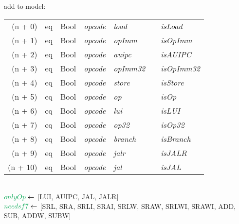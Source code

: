 \begin{algorithm}
    add to model:\\
    \begin{tabular}[h]{>{\ttfamily\color{UniRed}}r >{\ttfamily}l >{\ttfamily\color{UniGrey}}l >{\slshape\color{UniRed}}l >{\slshape\color{UniRed}}l >{\slshape\color{UniRed}}l >{\slshape} l}
        \hline
        \hline
        (n + 0)  & eq & Bool & opcode & load    &  & isLoad    \\
        (n + 1)  & eq & Bool & opcode & opImm   &  & isOpImm   \\
        (n + 2)  & eq & Bool & opcode & auipc   &  & isAUIPC   \\
        (n + 3)  & eq & Bool & opcode & opImm32 &  & isOpImm32 \\
        (n + 4)  & eq & Bool & opcode & store   &  & isStore   \\
        (n + 5)  & eq & Bool & opcode & op      &  & isOp      \\
        (n + 6)  & eq & Bool & opcode & lui     &  & isLUI     \\
        (n + 7)  & eq & Bool & opcode & op32    &  & isOp32    \\
        (n + 8)  & eq & Bool & opcode & branch  &  & isBranch  \\
        (n + 9)  & eq & Bool & opcode & jalr    &  & isJALR    \\
        (n + 10) & eq & Bool & opcode & jal     &  & isJAL     \\
        \hline
        \hline
    \end{tabular}\\
    $\textcolor{Green}{onlyOp} \leftarrow$ [LUI, AUIPC, JAL, JALR]\\
    $\textcolor{Green}{needsf7} \leftarrow$ [SRL, SRA, SRLI, SRAI, SRLW, SRAW, SRLWI, SRAWI, ADD, SUB, ADDW, SUBW]\\

\end{algorithm}

